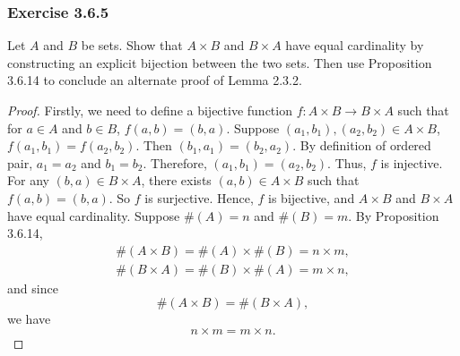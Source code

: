 \documentclass[12pt, letter]{article}
\begin{document}
\subsubsection*{Exercise 3.6.5}
Let $A$ and $B$ be sets. Show that $A\times B$ and $B\times A$ have equal cardinality by constructing an explicit bijection between the two sets. Then use Proposition 3.6.14 to conclude an alternate proof of Lemma 2.3.2.
\begin{proof}
    Firstly, we need to define a bijective function $f:A\times B\to B\times A$ such that for $a\in A$ and $b\in B$, $f(a,b)=(b,a)$. 
    Suppose $(a_1,b_1),(a_2,b_2)\in A\times B$, $f(a_1,b_1)=f(a_2,b_2)$. Then $(b_1,a_1)=(b_2,a_2)$. By definition of ordered pair, $a_1=a_2$ and $b_1=b_2$.
    Therefore, $(a_1,b_1)=(a_2,b_2)$. Thus, $f$ is injective. For any $(b,a)\in B\times A$, there exists $(a,b)\in A\times B$ such that $f(a,b)=(b,a)$. So $f$ is surjective.
    Hence, $f$ is bijective, and $A\times B$ and $B\times A$ have equal cardinality. Suppose $\#(A)=n$ and $\#(B)=m$. By Proposition 3.6.14,
    \begin{equation*}
        \begin{gathered}
            \#(A\times B)=\#(A)\times \#(B)=n\times m,\\
            \#(B\times A)=\#(B)\times \#(A)=m\times n,
        \end{gathered}
    \end{equation*}
    and since 
    \begin{equation*}
        \#(A\times B)=\#(B\times A),
    \end{equation*}
    we have 
    \begin{equation*}
        n\times m=m\times n.
    \end{equation*}
\end{proof} 
\end{document}
